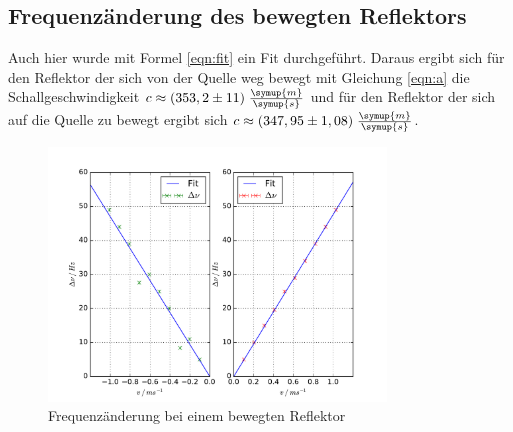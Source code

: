 \FloatBarrier
\subsection{Frequenzänderung des bewegten Reflektors}

Auch hier wurde mit Formel \eqref{eqn:fit} ein Fit durchgeführt. Daraus ergibt
sich für den Reflektor der sich von der Quelle weg bewegt mit Gleichung \eqref{eqn:a}
die Schallgeschwindigkeit $c \approx ( 353,2 \pm 11)\; \frac{\symup{m}}{\symup{s}}$
und für den Reflektor der sich auf die Quelle zu bewegt ergibt sich
$c \approx (347,95 \pm 1,08)\; \frac{\symup{m}}{\symup{s}}$.
\begin{figure}
  \centering
  \includegraphics[width = 0.8\textwidth]{plots/eplot.pdf}
  \caption{Frequenzänderung bei einem bewegten Reflektor}
  \label{fig:e}
\end{figure}



























%
